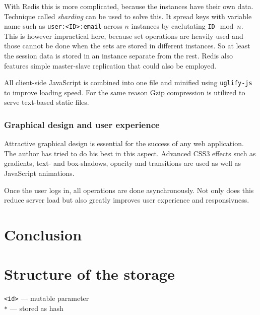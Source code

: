 \documentclass[12pt,oneside]{fithesis}
\begin{document}
		With Redis this is more complicated, because the instances have their own data. Technique called \emph{sharding} can be used to solve this. It spread keys with variable name such as \texttt{user:<ID>:email} across $n$ instances by caclutating \texttt{ID}$\mod{n}$. This is however impractical here, because set operations are heavily used and those cannot be done when the sets are stored in different instances. So at least the session data is stored in an instance separate from the rest. Redis also features simple master-slave replication that could also be employed.
		
		All client-side JavaScript is combined into one file and minified using \texttt{uglify-js} to improve loading speed. For the same reason Gzip compression is utilized to serve text-based static files.
	\subsection{Graphical design and user experience}
		Attractive graphical design is essential for the success of any web application. The author has tried to do his best in this aspect. Advanced CSS3 effects such as gradients, text- and box-shadows, opacity and transitions are used as well as JavaScript animations.
		
		Once the user logs in, all operations are done asynchronously. Not only does this reduce server load but also greatly improves user experience and responsivness.
\chapter{Conclusion}

\appendix
\chapter{Structure of the storage}
\label{appendix:scheme}
\texttt{<id>} --- mutable parameter\\
\texttt{*} --- stored as hash
\inputminted[fontsize=\footnotesize]{yaml}{scheme.txt}


\end{document}
